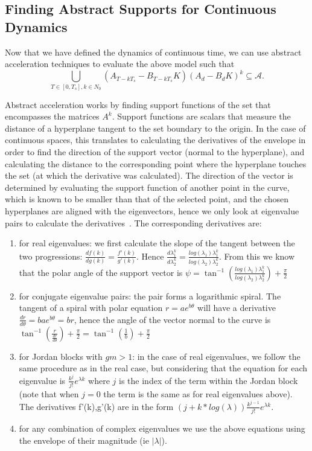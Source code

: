 \documentclass[twocolumn]{autart}    %
\newcommand{\mat}[1]{{#1}}
\begin{document}
 \subsection{Finding Abstract Supports for Continuous Dynamics}
 \label{sec:cont_aasup}

Now that we have defined the dynamics of continuous time, we can use abstract acceleration techniques to evaluate
the above model such that
\begin{equation}\label{eq:aa_cont_amatrix}
\bigcup_{T \in [0, T_s], k \in N_0} (\mat{A}_{T-kT_s}-\mat{B}_{T-kT_s}\mat{K}) (\mat{A}_d-\mat{B}_d\mat{K})^k \subseteq \mathcal{A}.
\end{equation}

Abstract acceleration works by finding support functions of the set that encompasses the matrices $\mat{A}^k$.
Support functions are scalars that measure the distance of a hyperplane tangent to the set boundary to the origin.
In the case of continuous spaces, this translates to calculating the derivatives of the envelope in order to find the direction of the support vector (normal to the hyperplane), and calculating the distance to the corresponding point where the hyperplane touches the set (at which the derivative was calculated).
The direction of the vector is determined by evaluating the support function of another point in the curve,
which is known to be smaller than that of the selected point, and the chosen hyperplanes are aligned with the eigenvectors, hence we only look at eigenvalue pairs to calculate the derivatives~\cite{cattaruzza2015unbounded}.
The corresponding derivatives are:
%
\begin{enumerate}
%
\item for real eigenvalues: we first calculate the slope of the tangent
between the two progressions: $\frac{d f(k)}{d g(k)}=\frac{f'(k)}{g'(k)}$. 
Hence $\frac{d \lambda_1^k}{d \lambda_2^k}=\frac{log(\lambda_1)
\lambda_1^k}{log(\lambda_2) \lambda_2^k}$.  From this we know that the polar
angle of the support vector is $\psi = \tan^{-1}(\frac{log(\lambda_1)
\lambda_1^k}{log(\lambda_2) \lambda_2^k})+\frac{\pi}{2}$
%
\item for conjugate eigenvalue pairs: the pair forms a logarithmic spiral. 
The tangent of a spiral with polar equation $r=a e^{b\theta}$ will have a
derivative $\frac{d r}{d \theta}=b a e^{b\theta}=b r$, hence the angle of
the vector normal to the curve is $\tan^{-1}(\frac{r}{\frac{d r}{d
\theta}})+\frac{\pi}{2}=\tan^{-1}(\frac{1}{b})+\frac{\pi}{2}$
%
\item for Jordan blocks with $gm>1$: in the case of real eigenvalues, we
follow the same procedure as in the real case, but considering that the
equation for each eigenvalue is $\frac{k^j}{j!}e^{\lambda k}$ where $j$ is
the index of the term within the Jordan block (note that when $j=0$ the term
is the same as for real eigenvalues above).  The derivatives f'(k),g'(k) are
in the form $(j+k*log(\lambda))\frac{k^{j-1}}{j!}e^{\lambda k}$.
%
\item for any combination of complex eigenvalues we use the above equations
using the envelope of their magnitude (ie $|\lambda|$).
%
\end{enumerate}
\end{document}
